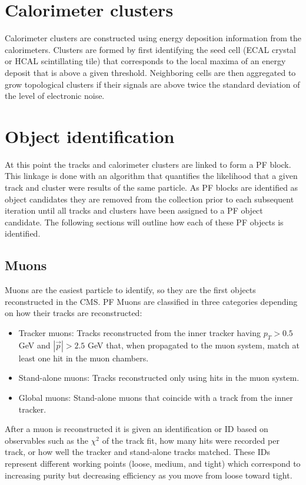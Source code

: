 \section{Calorimeter clusters}
Calorimeter clusters are constructed using energy deposition information from the calorimeters.  Clusters are formed by first identifying the seed cell (ECAL crystal or HCAL scintillating tile) that corresponds to the local maxima of an energy deposit that is above a given threshold.  Neighboring cells are then aggregated to grow topological clusters if their signals are above twice the standard deviation of the level of electronic noise.  

\section{Object identification}
At this point the tracks and calorimeter clusters are linked to form a PF block.  This linkage is done with an algorithm that quantifies the likelihood that a given track and cluster were results of the same particle.  As PF blocks are identified as object candidates they are removed from the collection prior to each subsequent iteration until all tracks and clusters have been assigned to a PF object candidate.  The following sections will outline how each of these PF objects is identified.
\subsection{Muons}
Muons are the easiest particle to identify, so they are the first objects reconstructed in the CMS.  PF Muons are classified in three categories depending on how their tracks are reconstructed:
\begin{itemize}
	\item Tracker muons:  Tracks reconstructed from the inner tracker having $p_T>0.5$ GeV and $|\vec{p}|>2.5$ GeV that, when propagated to the muon system, match at least one hit in the muon chambers.
	\item Stand-alone muons:  Tracks reconstructed only using hits in the muon system.
	\item Global muons:  Stand-alone muons that coincide with a track from the inner tracker.
\end{itemize}
After a muon is reconstructed it is given an identification or ID based on observables such as the $\chi^2$ of the track fit, how many hits were recorded per track, or how well the tracker and stand-alone tracks matched.  These IDs represent different working points (loose, medium, and tight) which correspond to increasing purity but decreasing efficiency as you move from loose toward tight.  
\label{section:muondefinitions}

